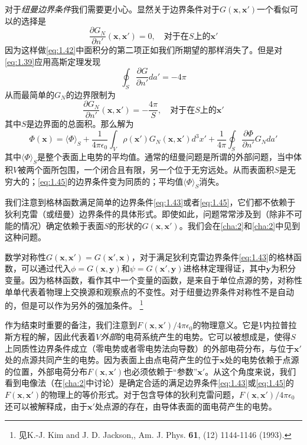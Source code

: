 \documentclass[12pt]{book}
\numberwithin{equation}{chapter}
\numberwithin{figure}{chapter}
\numberwithin{footnote}{page}
\begin{document}
对于\textit{纽曼边界条件}我们需要更小心。显然关于边界条件对于$G(\mathbf{x},\mathbf{x'})$一个看似可以的选择是
$$\frac{\partial G_N}{\partial n'}(\mathbf{x},\mathbf{x'})=0, \quad \mbox{对于在}S\mbox{上的}\mathbf{x'}$$
因为这样做\autoref{eq:1.42}中面积分的第二项正如我们所期望的那样消失了。但是对\autoref{eq:1.39}应用高斯定理发现
$$\oint_S \frac{\partial G}{\partial n'}da'=-4\pi$$
从而最简单的$G_N$的边界限制为
\begin{equation}\label{eq:1.45}
    \frac{\partial G_N}{\partial n'}(\mathbf{x},\mathbf{x'})=-\frac{4\pi}{S}, \quad \mbox{对于在}S\mbox{上的}\mathbf{x'}
\end{equation}
其中$S$是边界面的总面积。那么解为
\begin{equation}\label{eq:1.46}
    \Phi(\mathbf{x})=\langle \Phi \rangle_S+\frac{1}{4\pi\epsilon_0}\int_V \rho(\mathbf{x'})G_N(\mathbf{x},\mathbf{x'})d^3x'+\frac{1}{4\pi}\oint_S \frac{\partial \Phi}{\partial n'}G_Nda'
\end{equation}
其中$\langle \Phi \rangle_S$是整个表面上电势的平均值。通常的纽曼问题是所谓的外部问题，当中体积$V$被两个面所包围，一个闭合且有限，另一个位于无穷远处。从而表面积$S$是无穷大的；\autoref{eq:1.45}的边界条件变为同质的；平均值$\langle \Phi \rangle_S$消失。

我们注意到格林函数满足简单的边界条件\autoref{eq:1.43}或者\autoref{eq:1.45}，它们都不依赖于狄利克雷（或纽曼）边界条件的具体形式。即使如此，问题常常涉及到（除非不可能的情况）确定依赖于表面$S$的形状的$G(\mathbf{x},\mathbf{x'})$。我们会在\autoref{cha:2}和\autoref{cha:2}中见到这种问题。

数学对称性$G(\mathbf{x},\mathbf{x'})=G(\mathbf{x'},\mathbf{x})$，对于满足狄利克雷边界条件\autoref{eq:1.43}的格林函数，可以通过代入$\phi=G(\mathbf{x},\mathbf{y})$和$\psi=G(\mathbf{x'},\mathbf{y})$进格林定理得证，其中$\mathbf{y}$为积分变量。因为格林函数，看作其中一个变量的函数，是来自于单位点源的势，对称性单单代表着物理上交换源和观察点的不变性。对于纽曼边界条件对称性不是自动的，但是可以作为另外的强加条件。
\footnote{见K.-J. Kim and J. D. Jackson,, Am. J. Phys. \textbf{61}, (12) 1144-1146 (1993).}

作为结束时重要的备注，我们注意到$F(\mathbf{x},\mathbf{x'})/4\pi\epsilon_0$的物理意义。它是$V$内拉普拉斯方程的解，因此代表着\textit{$V$外部}的电荷系统产生的电势。它可以被想成是，使得$S$上同质性边界条件成立（零电势或者零电势法向导数）的外部电荷分布，与位于$\mathbf{x'}$处的点源共同产生的电势。因为表面上由点电荷产生的位于$\mathbf{x}$处的电势依赖于点源的位置，外部电荷分布$F(\mathbf{x},\mathbf{x'})$也必须依赖于“参数”$\mathbf{x'}$。从这个角度来说，我们看到电像法（在\autoref{cha:2}中讨论）是确定合适的满足边界条件\autoref{eq:1.43}或\autoref{eq:1.45}的$F(\mathbf{x},\mathbf{x'})$的物理上的等价形式。对于包含导体的狄利克雷问题，$F(\mathbf{x},\mathbf{x'})/4\pi\epsilon_0$还可以被解释成，由于$\mathbf{x'}$处点源的存在，由导体表面的面电荷产生的电势。
\end{document}
